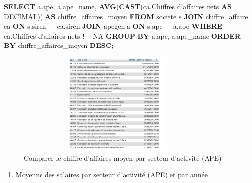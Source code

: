 \documentclass[mstat,12pt]{unswthesis}
\newenvironment{Shaded}{\begin{snugshade}}{\end{snugshade}}
\newcommand{\DataTypeTok}[1]{\textcolor[rgb]{0.13,0.29,0.53}{#1}}
\newcommand{\FunctionTok}[1]{\textcolor[rgb]{0.13,0.29,0.53}{\textbf{#1}}}
\newcommand{\KeywordTok}[1]{\textcolor[rgb]{0.13,0.29,0.53}{\textbf{#1}}}
\newcommand{\NormalTok}[1]{#1}
\newcommand{\OperatorTok}[1]{\textcolor[rgb]{0.81,0.36,0.00}{\textbf{#1}}}
\newcommand{\StringTok}[1]{\textcolor[rgb]{0.31,0.60,0.02}{#1}}
\begin{document}
\medskip

\begin{Shaded}
\begin{Highlighting}[]

\KeywordTok{SELECT} 
\NormalTok{  a.ape, }
\NormalTok{  a.ape\_name, }
  \FunctionTok{AVG}\NormalTok{(}\FunctionTok{CAST}\NormalTok{(ca.\textasciigrave{}Chiffres d’affaires nets\textasciigrave{} }\KeywordTok{AS} \DataTypeTok{DECIMAL}\NormalTok{)) }
  \KeywordTok{AS}\NormalTok{ chiffre\_affaires\_moyen }
\KeywordTok{FROM} 
\NormalTok{  societe s }
  \KeywordTok{JOIN}\NormalTok{ chiffre\_affaire ca }\KeywordTok{ON}\NormalTok{ s.siren }\OperatorTok{=}\NormalTok{ ca.siren }
  \KeywordTok{JOIN}\NormalTok{ apegen a }\KeywordTok{ON}\NormalTok{ s.ape }\OperatorTok{=}\NormalTok{ a.ape }
\KeywordTok{WHERE} 
\NormalTok{  ca.\textasciigrave{}Chiffres d’affaires nets\textasciigrave{} }\OperatorTok{!=} \StringTok{\textquotesingle{}NA\textquotesingle{}} 
\KeywordTok{GROUP} \KeywordTok{BY} 
\NormalTok{  a.ape, }
\NormalTok{  a.ape\_name }
\KeywordTok{ORDER} \KeywordTok{BY} 
\NormalTok{  chiffre\_affaires\_moyen }\KeywordTok{DESC}\NormalTok{;}
\end{Highlighting}
\end{Shaded}

\begin{figure}
\centering
\includegraphics[width=10cm,height=5cm]{image_sql/compere_APE.png}
\caption{Comparer le chiffre d'affaires moyen par secteur d'activité
(APE)}
\end{figure}

\begin{enumerate}
\def\labelenumi{\arabic{enumi})}
\setcounter{enumi}{4}
\tightlist
\item
  Moyenne des salaires par secteur d'activité (APE) et par année
  \medskip
\end{enumerate}
\end{document}
